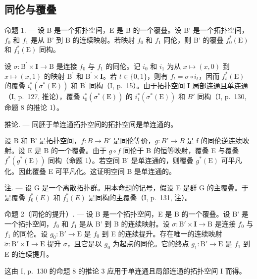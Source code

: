 \subsection{同伦与覆叠}

命题 1. --- 设 B 是一个拓扑空间，E 是 B 的一个覆叠。设 B' 是一个拓扑空间，\(f_0\) 和 \(f_1\) 是从 B' 到 B 的连续映射。若映射 \(f_0\) 和 \(f_1\) 同伦，则 B' 的覆叠 \(f_0^*(\mathrm{E})\) 和 \(f_1^*(\mathrm{E})\) 同构。

设 \(\sigma\colon\mathrm{B}^{\prime}\times\mathbf{I}\to\mathrm{B}\) 是连接 \(f_{0}\) 与 \(f_{1}\) 的同伦。记 \(i_{0}\) 和 \(i_{1}\) 为从 \(x\mapsto(x,0)\) 到 \(x\mapsto(x,1)\) 的映射 \(\mathrm{B}^{\prime}\) 和 \(\mathrm{B}^{\prime}\times\mathbf{I}\)。若 \(t\in\{0,1\}\)，则有 \(f_{t}=\sigma\circ i_{t}\)，因而 \(f_{t}^{*}(\mathrm{E})\) 的覆叠 \(i_{t}^{*}(\sigma^{*}(\mathrm{E}))\) 和 \(\mathrm{B}^{\prime}\) 同构（I, p.~15）。由于拓扑空间 \(\mathbf{I}\) 局部连通且单连通（I, p.~127, 推论），覆叠 \(i_{0}^{*}(\sigma^{*}(\mathrm{E}))\) 的 \(i_{1}^{*}(\sigma^{*}(\mathrm{E}))\) 和 \(B'\) 同构（I, p.~130, 命题 8 的推论 1）。

推论. --- 同胚于单连通拓扑空间的拓扑空间是单连通的。

设 B 和 B' 是拓扑空间，\(f: B \rightarrow B'\) 是同伦等价，\(g: B' \rightarrow B\) 是 f 的同伦逆连续映射。设 E 是 B 的一个覆叠。由于 \(g \circ f\) 同伦于 B 的恒等映射，覆叠 E 与覆叠 \(f^{*}(g^{*}(\mathrm{E}))\) 同构（命题 1）。若空间 B' 是单连通的，则覆叠 \(g^{*}(\mathrm{E})\) 可平凡化。因此覆叠 E 可平凡化。这证明空间 B 是单连通的。

注. --- 设 G 是一个离散拓扑群。用本命题的记号，假设 E 是群 G 的主覆叠。于是覆叠 \(f_{0}^{*}(E)\) 和 \(f_{1}^{*}(E)\) 是同构的主覆叠（I, p.~131, 注）。

命题 2（同伦的提升）. --- 设 B 是一个拓扑空间，E 是 B 的一个覆叠。设 B' 是一个拓扑空间，\(f_0\) 和 \(f_1\) 是从 B' 到 B 的连续映射。设 \(\sigma: \mathrm{B}' \times \mathbf{I} \to \mathrm{B}\) 是连接 \(f_0\) 与 \(f_1\) 的同伦。设 \(g_0: \mathrm{B}' \to \mathrm{E}\) 是 \(f_0\) 到 E 的连续提升。存在唯一的连续映射 \(\widetilde{\sigma}: \mathrm{B}' \times \mathbf{I} \to \mathrm{E}\) 提升 \(\sigma\)，且它是以 \(g_0\) 为起点的同伦。它的终点 \(g_1: \mathrm{B}' \to \mathrm{E}\) 是 \(f_1\) 到 E 的连续提升。

这由 I, p.~130 的命题 8 的推论 3 应用于单连通且局部连通的拓扑空间 I 而得。

